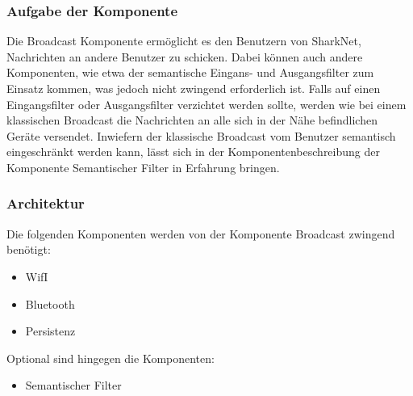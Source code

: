 \subsubsection{Aufgabe der Komponente}
Die Broadcast Komponente ermöglicht es den Benutzern von SharkNet, Nachrichten an andere Benutzer zu schicken. Dabei können auch andere Komponenten, wie etwa der semantische Eingans- und Ausgangsfilter zum Einsatz kommen, was jedoch nicht zwingend erforderlich ist. Falls auf einen Eingangsfilter oder Ausgangsfilter verzichtet werden sollte, werden wie bei einem klassischen Broadcast die Nachrichten an alle sich in der Nähe befindlichen Geräte versendet. Inwiefern der klassische Broadcast vom Benutzer semantisch eingeschränkt werden kann, lässt sich in der Komponentenbeschreibung der Komponente Semantischer Filter in Erfahrung bringen.

\subsubsection{Architektur}

Die folgenden Komponenten werden von der Komponente Broadcast zwingend benötigt:
\begin{itemize}
\item WifI 
\item Bluetooth 
\item Persistenz 
\end{itemize}
Optional sind hingegen die Komponenten:
\begin{itemize}
	\item Semantischer Filter
\end{itemize}

